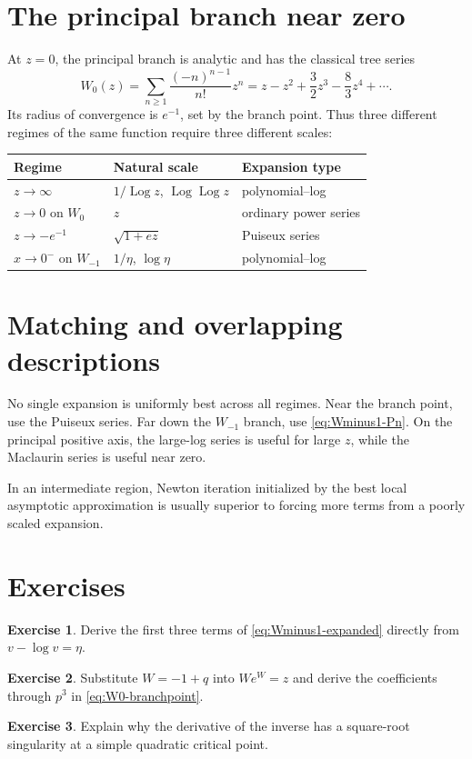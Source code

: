 \documentclass[11pt,openany]{book}
\theoremstyle{definition}
\newtheorem{exercise}{Exercise}[chapter]
\theoremstyle{plain}
\theoremstyle{remark}
\DeclareMathOperator{\Log}{Log}
\begin{document}
\section{The principal branch near zero}
At \(z=0\), the principal branch is analytic and has the classical tree series
\begin{equation}\label{eq:W-Maclaurin}
 W_0(z)=\sum_{n\ge1}\frac{(-n)^{n-1}}{n!}z^n
 =z-z^2+\frac32z^3-\frac83z^4+\cdots.
\end{equation}
Its radius of convergence is \(e^{-1}\), set by the branch point. Thus three different regimes of the same function require three different scales:
\begin{center}
\begin{tabular}{@{}lll@{}}
\toprule
Regime & Natural scale & Expansion type\\
\midrule
\(z\to\infty\) & \(1/\Log z\), \(\Log\Log z\) & polynomial--log\\
\(z\to0\) on \(W_0\) & \(z\) & ordinary power series\\
\(z\to-e^{-1}\) & \(\sqrt{1+ez}\) & Puiseux series\\
\(x\to0^-\) on \(W_{-1}\) & \(1/\eta\), \(\log\eta\) & polynomial--log\\
\bottomrule
\end{tabular}
\end{center}

\section{Matching and overlapping descriptions}
No single expansion is uniformly best across all regimes. Near the branch point, use the Puiseux series. Far down the \(W_{-1}\) branch, use \cref{eq:Wminus1-Pn}. On the principal positive axis, the large-log series is useful for large \(z\), while the Maclaurin series is useful near zero.

In an intermediate region, Newton iteration initialized by the best local asymptotic approximation is usually superior to forcing more terms from a poorly scaled expansion.

\section{Exercises}
\begin{exercise}
Derive the first three terms of \cref{eq:Wminus1-expanded} directly from \(v-\log v=\eta\).
\end{exercise}
\begin{exercise}
Substitute \(W=-1+q\) into \(We^W=z\) and derive the coefficients through \(p^3\) in \cref{eq:W0-branchpoint}.
\end{exercise}
\begin{exercise}
Explain why the derivative of the inverse has a square-root singularity at a simple quadratic critical point.
\end{exercise}
\end{document}
